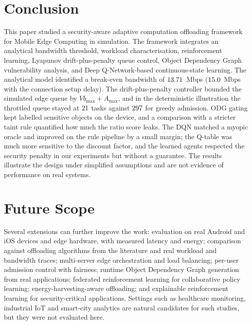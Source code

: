 \documentclass{ieeeaccess}
\begin{document}
\section{Conclusion}
This paper studied a security-aware adaptive computation offloading framework for Mobile Edge Computing in simulation. The framework integrates an analytical bandwidth threshold, workload characterisation, reinforcement learning, Lyapunov drift-plus-penalty queue control, Object Dependency Graph vulnerability analysis, and Deep Q-Network-based continuous-state learning. The analytical model identified a break-even bandwidth of $13.71$~Mbps ($15.0$~Mbps with the connection setup delay). The drift-plus-penalty controller bounded the simulated edge queue by $Vb_\text{max}+A_\text{max}$, and in the deterministic illustration the throttled queue stayed at $21$ tasks against $297$ for greedy admission. ODG gating kept labelled sensitive objects on the device, and a comparison with a stricter taint rule quantified how much the ratio score leaks. The DQN matched a myopic oracle and improved on the rule pipeline by a small margin; the Q-table was much more sensitive to the discount factor, and the learned agents respected the security penalty in our experiments but without a guarantee. The results illustrate the design under simplified assumptions and are not evidence of performance on real systems.

\section{Future Scope}
Several extensions can further improve the work: evaluation on real Android and iOS devices and edge hardware, with measured latency and energy; comparison against offloading algorithms from the literature and real workload and bandwidth traces; multi-server edge orchestration and load balancing; per-user admission control with fairness; runtime Object Dependency Graph generation from real applications; federated reinforcement learning for collaborative policy learning; energy-harvesting-aware offloading; and explainable reinforcement learning for security-critical applications. Settings such as healthcare monitoring, industrial IoT and smart-city analytics are natural candidates for such studies, but they were not evaluated here.




\EOD
\end{document}
